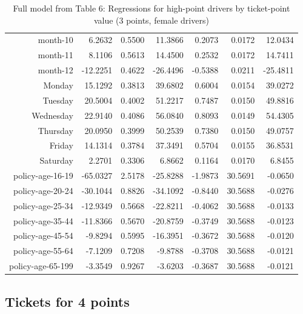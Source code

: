 \documentclass[10pt]{article}
\begin{document}
\begin{table}[ht]
\begin{tabular}{rrrrrrr}
  month-10 & 6.2632 & 0.5500 & 11.3866 & 0.2073 & 0.0172 & 12.0434 \\ 
  month-11 & 8.1106 & 0.5613 & 14.4500 & 0.2532 & 0.0172 & 14.7411 \\ 
  month-12 & -12.2251 & 0.4622 & -26.4496 & -0.5388 & 0.0211 & -25.4811 \\ 
  Monday & 15.1292 & 0.3813 & 39.6802 & 0.6004 & 0.0154 & 39.0272 \\ 
  Tuesday & 20.5004 & 0.4002 & 51.2217 & 0.7487 & 0.0150 & 49.8816 \\ 
  Wednesday & 22.9140 & 0.4086 & 56.0840 & 0.8093 & 0.0149 & 54.4305 \\ 
  Thursday & 20.0950 & 0.3999 & 50.2539 & 0.7380 & 0.0150 & 49.0757 \\ 
  Friday & 14.1314 & 0.3784 & 37.3491 & 0.5704 & 0.0155 & 36.8531 \\ 
  Saturday & 2.2701 & 0.3306 & 6.8662 & 0.1164 & 0.0170 & 6.8455 \\ 
  policy-age-16-19 & -65.0327 & 2.5178 & -25.8288 & -1.9873 & 30.5691 & -0.0650 \\ 
  policy-age-20-24 & -30.1044 & 0.8826 & -34.1092 & -0.8440 & 30.5688 & -0.0276 \\ 
  policy-age-25-34 & -12.9349 & 0.5668 & -22.8211 & -0.4062 & 30.5688 & -0.0133 \\ 
  policy-age-35-44 & -11.8366 & 0.5670 & -20.8759 & -0.3749 & 30.5688 & -0.0123 \\ 
  policy-age-45-54 & -9.8294 & 0.5995 & -16.3951 & -0.3672 & 30.5688 & -0.0120 \\ 
  policy-age-55-64 & -7.1209 & 0.7208 & -9.8788 & -0.3708 & 30.5688 & -0.0121 \\ 
  policy-age-65-199 & -3.3549 & 0.9267 & -3.6203 & -0.3687 & 30.5688 & -0.0121 \\ 
   \hline
\end{tabular}
\caption{Full model from Table 6: Regressions for high-point drivers by ticket-point value (3 points, female drivers)} 
\label{tab_6_3_pts_F}
\end{table}


\clearpage
\pagebreak




\subsection*{Tickets for 4 points}
\end{document}
